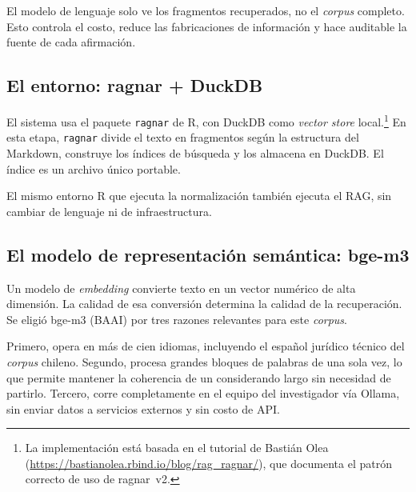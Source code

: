 \documentclass[12pt,a4paper]{article}
\begin{document}
El modelo de lenguaje solo ve los fragmentos recuperados, no el \textit{corpus}
completo. Esto controla el costo, reduce las fabricaciones de información y hace
auditable la fuente de cada afirmación.

\subsection{El entorno: ragnar + DuckDB}

El sistema usa el paquete \texttt{ragnar} de R, con DuckDB como
\textit{vector store} local.\footnote{La implementación está basada en el tutorial de
Bastián Olea (\url{https://bastianolea.rbind.io/blog/rag_ragnar/}), que documenta
el patrón correcto de uso de ragnar~v2.} En esta etapa, \texttt{ragnar} divide el texto en
fragmentos según la estructura del Markdown, construye los índices de búsqueda y
los almacena en DuckDB. El índice es un archivo único portable.

El mismo entorno R que ejecuta la normalización también ejecuta el RAG, sin
cambiar de lenguaje ni de infraestructura.


\subsection{El modelo de representación semántica: bge-m3}

Un modelo de \textit{embedding} convierte texto en un vector numérico de alta
dimensión. La calidad de esa conversión determina la calidad de la recuperación.
Se eligió bge-m3 (BAAI) por tres razones relevantes para este \textit{corpus}.

Primero, opera en más de cien idiomas, incluyendo el español
jurídico técnico del \textit{corpus} chileno. Segundo, procesa grandes bloques de palabras 
de una sola vez, lo que permite mantener la coherencia de un
considerando largo sin necesidad de partirlo. Tercero, corre completamente en el
equipo del investigador vía Ollama, sin enviar datos a servicios externos y
sin costo de API.
\end{document}
